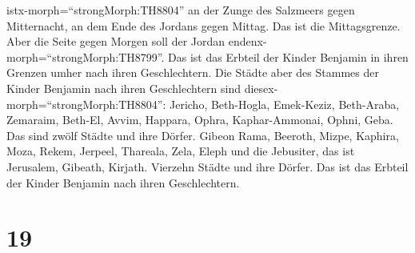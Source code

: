 istx-morph=``strongMorph:TH8804'' an der Zunge des Salzmeers gegen
Mitternacht, an dem Ende des Jordans gegen Mittag. Das ist die
Mittagsgrenze.  Aber die Seite gegen Morgen soll der Jordan
endenx-morph=``strongMorph:TH8799''. Das ist das Erbteil der Kinder
Benjamin in ihren Grenzen umher nach ihren Geschlechtern. 
Die Städte aber des Stammes der Kinder Benjamin nach ihren Geschlechtern
sind diesex-morph=``strongMorph:TH8804'': Jericho, Beth-Hogla,
Emek-Keziz,  Beth-Araba, Zemaraim, Beth-El, 
Avvim, Happara, Ophra,  Kaphar-Ammonai, Ophni, Geba. Das
sind zwölf Städte und ihre Dörfer.  Gibeon Rama, Beeroth,
 Mizpe, Kaphira, Moza,  Rekem, Jerpeel,
Thareala,  Zela, Eleph und die Jebusiter, das ist
Jerusalem, Gibeath, Kirjath. Vierzehn Städte und ihre Dörfer. Das ist
das Erbteil der Kinder Benjamin nach ihren Geschlechtern.

\hypertarget{section-18}{%
\section{19}\label{section-18}}

